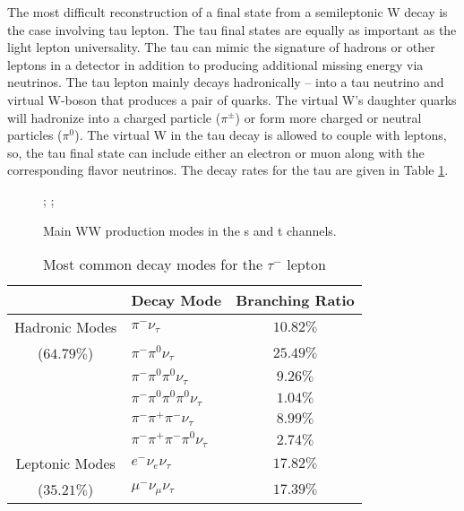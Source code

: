   The most difficult reconstruction of a final state from a semileptonic W decay is the case involving tau lepton. The tau final states are equally as important as the light lepton universality. The tau can mimic the signature of hadrons or other leptons in a detector in addition to producing additional missing energy via neutrinos.  The tau lepton mainly decays hadronically -- into a tau neutrino and virtual W-boson that produces a pair of quarks. The virtual W's daughter quarks will hadronize into a charged particle ($\pi^\pm$) or form more charged or neutral particles ($\pi^0$). The virtual W in the tau decay is allowed to couple with leptons, so, the tau final state can include either an electron or muon along with the corresponding flavor neutrinos. The decay rates for the tau are given in Table \ref{tab:taudecay}.
\begin{figure}
\centering
{};
    ;
\caption{\label{fig:wwdiag} Main WW production modes in the s and t channels. }
\end{figure}
\begin{table}
\centering
 \begin{tabular}{|c|l|c|} 
 
 \hline
       & Decay Mode & Branching Ratio  \\ \hline \hline
    Hadronic Modes  & $\pi^- \nu_\tau$  & $10.82\%$  \\
      	($64.79\%$) & $\pi^- \pi^0 \nu_\tau$ & $25.49\%$ \\
     				& $\pi^- \pi^0 \pi^0 \nu_\tau$  & $9.26\%$  \\
     				& $\pi^- \pi^0 \pi^0 \pi^0 \nu_\tau$  & $1.04\%$   \\
      				& $\pi^- \pi^+ \pi^- \nu_\tau$  & $8.99\%$      \\ 
      				& $\pi^- \pi^+ \pi^- \pi^0 \nu_\tau$  & $2.74\%$  \\ \hline
    			    
    Leptonic Modes  & $e^- \nu_e \nu_\tau$ & $17.82\%$   \\
    	($35.21\%$)	& $\mu^- \nu_\mu \nu_\tau $  & $17.39\%$      \\ \midrule \hline
      				
     				
\end{tabular}
        \caption{\label{tab:taudecay}Most common decay modes for the $\tau^-$ lepton \cite{pdg}}
\end{table}
       
